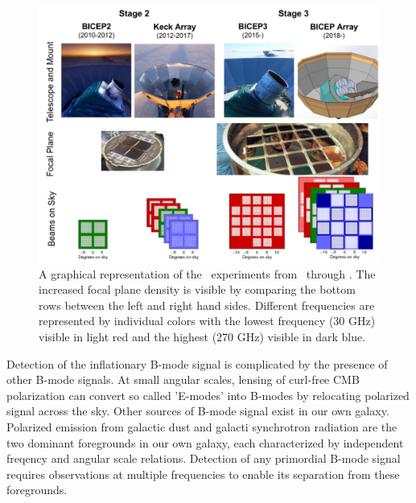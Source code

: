 \documentclass[]{spie}  %
\begin{document}
\begin{figure}[h]
	\center
	\includegraphics[scale=0.5]{progression.pdf}
	\caption{A graphical representation of the \bk \ experiments from 
	\ through \biceparray. The increased focal plane density is visible by
	comparing the bottom rows between the left and right hand sides. Different
	frequencies are represented by individual colors with the lowest frequency
	(30 GHz) visible in light red and the highest (270 GHz) visible in dark
	blue.}
	\label{fig:progression}
\end{figure}

Detection of the inflationary B-mode signal is complicated by the presence of
other B-mode signals. At small angular scales, lensing of curl-free CMB
polarization can convert so called 'E-modes' into B-modes by relocating
polarized signal across the sky. Other sources of B-mode signal exist in our
own galaxy. Polarized emission from galactic dust and galacti synchrotron
radiation are the two dominant foregrounds in our own galaxy, each
characterized by independent freqency and angular scale relations. Detection
of any primordial B-mode signal requires observations at multiple frequencies
to enable its separation from these foregrounds. 
\end{document}

